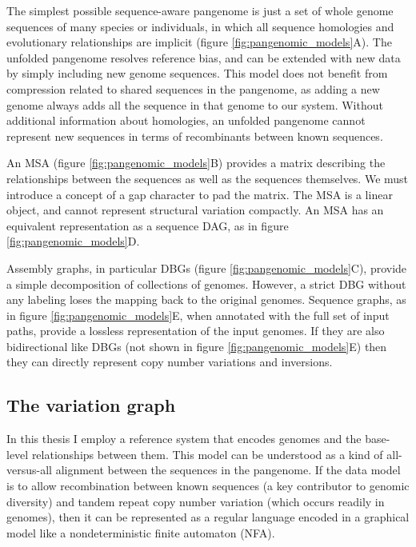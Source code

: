 \documentclass[a4paper,12pt,numbered,oneside]{Classes/PhDThesisPSnPDF}
\begin{document}
The simplest possible sequence-aware pangenome is just a set of whole genome sequences of many species or individuals, in which all sequence homologies and evolutionary relationships are implicit (figure \ref{fig:pangenomic_models}A).
The unfolded pangenome resolves reference bias, and can be extended with new data by simply including new genome sequences.
This model does not benefit from compression related to shared sequences in the pangenome, as adding a new genome always adds all the sequence in that genome to our system.
Without additional information about homologies, an unfolded pangenome cannot represent new sequences in terms of recombinants between known sequences.

An MSA (figure \ref{fig:pangenomic_models}B) provides a matrix describing the relationships between the sequences as well as the sequences themselves.
We must introduce a concept of a gap character to pad the matrix.
The MSA is a linear object, and cannot represent structural variation compactly.
An MSA has an equivalent representation as a sequence DAG, as in figure \ref{fig:pangenomic_models}D.

Assembly graphs, in particular DBGs (figure \ref{fig:pangenomic_models}C), provide a simple decomposition of collections of genomes.
However, a strict DBG without any labeling loses the mapping back to the original genomes.
Sequence graphs, as in figure \ref{fig:pangenomic_models}E, when annotated with the full set of input paths, provide a lossless representation of the input genomes.
If they are also bidirectional like DBGs (not shown in figure \ref{fig:pangenomic_models}E) then they can directly represent copy number variations and inversions.

\subsection{The variation graph}
\label{sec:the_variation_graph}

In this thesis I employ a reference system that encodes genomes and the base-level relationships between them.
This model can be understood as a kind of all-versus-all alignment between the sequences in the pangenome.
If the data model is to allow recombination between known sequences (a key contributor to genomic diversity) and tandem repeat copy number variation (which occurs readily in genomes), then it can be represented as a regular language encoded in a graphical model like a nondeterministic finite automaton (NFA).
\end{document}
